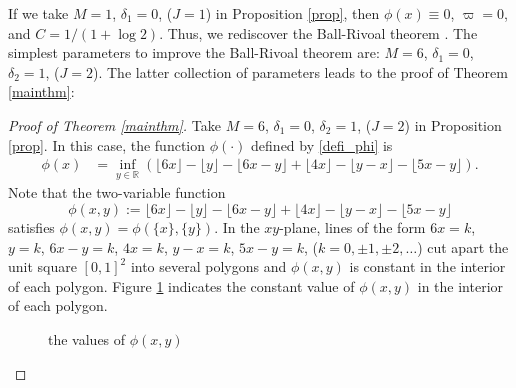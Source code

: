 \documentclass[12pt]{article}
\numberwithin{equation}{section}
\begin{document}
\bigskip

If we take $M=1$, $\delta_1=0$, ($J=1$) in Proposition \ref{prop}, then $\phi(x) \equiv 0$, $\varpi = 0$, and $C = 1/(1+\log 2)$. Thus, we rediscover the Ball-Rivoal theorem \cite{BR2001}. The simplest parameters to improve the Ball-Rivoal theorem are: $M=6$, $\delta_1=0$, $\delta_2=1$, ($J=2$). The latter collection of parameters leads to the proof of Theorem \ref{mainthm}:


\begin{proof}[Proof of Theorem \ref{mainthm}]
Take $M=6$, $\delta_1=0$, $\delta_2 = 1$, ($J=2$) in Proposition \ref{prop}. In this case, the function $\phi(\cdot)$ defined by \eqref{defi_phi} is
\begin{align*}
\phi(x) &= \inf_{y \in \mathbb{R}} \left(  \lfloor6x\rfloor - \lfloor y \rfloor - \lfloor 6x - y \rfloor + \lfloor4x\rfloor - \lfloor y- x \rfloor - \lfloor 5x - y \rfloor \right).
\end{align*} 
Note that the two-variable function
\[ \phi(x,y) := \lfloor6x\rfloor - \lfloor y \rfloor - \lfloor 6x - y \rfloor + \lfloor4x\rfloor - \lfloor y- x \rfloor - \lfloor 5x - y \rfloor \]
satisfies $\phi(x,y)=\phi(\{x\},\{y\})$. In the $xy$-plane, lines of the form $6x=k$, $y=k$, $6x-y=k$, $4x=k$, $y-x=k$, $5x-y=k$, ($k=0,\pm1,\pm2,\ldots$) cut apart the unit square $[0,1]^2$ into several polygons and $\phi(x,y)$ is constant in the interior of each polygon. Figure \ref{figure} indicates the constant value of $\phi(x,y)$ in the interior of each polygon.
\begin{figure}[h]
	\centering
    \caption{the values of $\phi(x,y)$}
    \label{figure}
\end{figure}
\end{proof}
\end{document}
